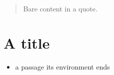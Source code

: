 \begin{quote}
Bare content in a quote.
\end{quote}

\begin{quote}
\end{quote}

\begin{quote}\end{quote}

\flmHeading[toc=true]
\section{A title }{\flmLabels{}}

\begin{itemize}
\item\phf a passage its environment ends
\end{itemize}

